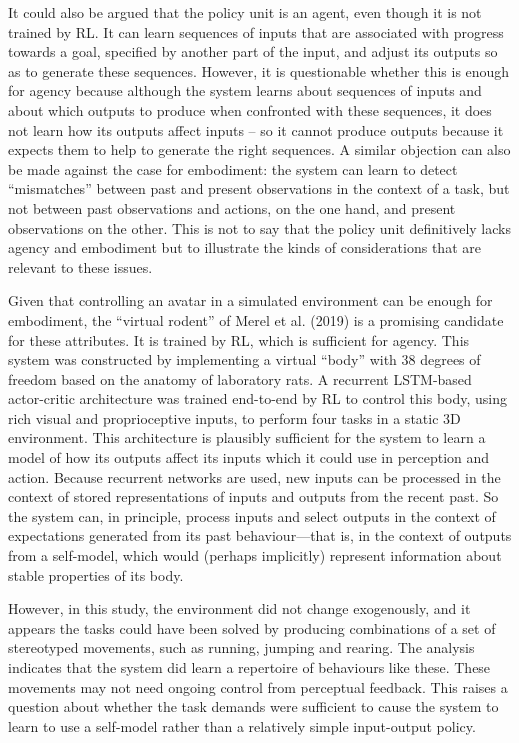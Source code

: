 \documentclass[12pt]{article}
\begin{document}
It could also be argued that the policy unit is an agent, even though it is not trained by RL. It can learn sequences of inputs that are associated with progress towards a goal, specified by another part of the input, and adjust its outputs so as to generate these sequences. However, it is questionable whether this is enough for agency because although the system learns about sequences of inputs and about which outputs to produce when confronted with these sequences, it does not learn how its outputs affect inputs – so it cannot produce outputs because it expects them to help to generate the right sequences. A similar objection can also be made against the case for embodiment: the system can learn to detect ``mismatches'' between past and present observations in the context of a task, but not between past observations and actions, on the one hand, and present observations on the other. This is not to say that the policy unit definitively lacks agency and embodiment but to illustrate the kinds of considerations that are relevant to these issues.

Given that controlling an avatar in a simulated environment can be enough for embodiment, the ``virtual rodent'' of Merel et al. (2019) is a promising candidate for these attributes. It is trained by RL, which is sufficient for agency. This system was constructed by implementing a virtual ``body'' with 38 degrees of freedom based on the anatomy of laboratory rats. A recurrent LSTM-based actor-critic architecture was trained end-to-end by RL to control this body, using rich visual and proprioceptive inputs, to perform four tasks in a static 3D environment. This architecture is plausibly sufficient for the system to learn a model of how its outputs affect its inputs which it could use in perception and action. Because recurrent networks are used, new inputs can be processed in the context of stored representations of inputs and outputs from the recent past. So the system can, in principle, process inputs and select outputs in the context of expectations generated from its past behaviour—that is, in the context of outputs from a self-model, which would (perhaps implicitly) represent information about stable properties of its body.

However, in this study, the environment did not change exogenously, and it appears the tasks could have been solved by producing combinations of a set of stereotyped movements, such as running, jumping and rearing. The analysis indicates that the system did learn a repertoire of behaviours like these. These movements may not need ongoing control from perceptual feedback. This raises a question about whether the task demands were sufficient to cause the system to learn to use a self-model rather than a relatively simple input-output policy.
\end{document}
